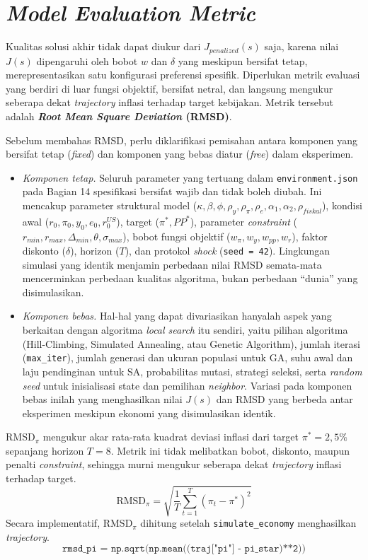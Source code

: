 \section{\textit{Model Evaluation Metric}}

Kualitas solusi akhir tidak dapat diukur dari $J_{penalized}(s)$ saja, karena nilai $J(s)$ dipengaruhi oleh bobot $w$ dan $\delta$ yang meskipun bersifat tetap, merepresentasikan satu konfigurasi preferensi spesifik. Diperlukan metrik evaluasi yang berdiri di luar fungsi objektif, bersifat netral, dan langsung mengukur seberapa dekat \textit{trajectory} inflasi terhadap target kebijakan. Metrik tersebut adalah \textbf{\textit{Root Mean Square Deviation} (RMSD)}.

Sebelum membahas RMSD, perlu diklarifikasi pemisahan antara komponen yang bersifat tetap (\textit{fixed}) dan komponen yang bebas diatur (\textit{free}) dalam eksperimen.

\begin{itemize}
    \item \textit{Komponen tetap.} Seluruh parameter yang tertuang dalam \texttt{environment.json} pada Bagian 14 spesifikasi bersifat wajib dan tidak boleh diubah. Ini mencakup parameter struktural model ($\kappa, \beta, \phi, \rho_y, \rho_\pi, \rho_e, \alpha_1, \alpha_2, \rho_{fiskal}$), kondisi awal ($r_0, \pi_0, y_0, e_0, r_0^{US}$), target ($\pi^{*}, PP^{*}$), parameter \textit{constraint} ($r_{min}, r_{max}, \Delta_{min}, \theta, \sigma_{max}$), bobot fungsi objektif ($w_\pi, w_y, w_{pp}, w_r$), faktor diskonto ($\delta$), horizon ($T$), dan protokol \textit{shock} (\texttt{seed = 42}). Lingkungan simulasi yang identik menjamin perbedaan nilai RMSD semata-mata mencerminkan perbedaan kualitas algoritma, bukan perbedaan ``dunia'' yang disimulasikan.
    \item \textit{Komponen bebas.} Hal-hal yang dapat divariasikan hanyalah aspek yang berkaitan dengan algoritma \textit{local search} itu sendiri, yaitu pilihan algoritma (Hill-Climbing, Simulated Annealing, atau Genetic Algorithm), jumlah iterasi (\texttt{max\_iter}), jumlah generasi dan ukuran populasi untuk GA, suhu awal dan laju pendinginan untuk SA, probabilitas mutasi, strategi seleksi, serta \textit{random seed} untuk inisialisasi state dan pemilihan \textit{neighbor}. Variasi pada komponen bebas inilah yang menghasilkan nilai $J(s)$ dan RMSD yang berbeda antar eksperimen meskipun ekonomi yang disimulasikan identik.
\end{itemize}
RMSD$_{\pi}$ mengukur akar rata-rata kuadrat deviasi inflasi dari target $\pi^{*} = 2{,}5\%$ sepanjang horizon $T = 8$. Metrik ini tidak melibatkan bobot, diskonto, maupun penalti \textit{constraint}, sehingga murni mengukur seberapa dekat \textit{trajectory} inflasi terhadap target.
\[
    \text{RMSD}_{\pi} = \sqrt{\frac{1}{T} \sum_{t=1}^{T} (\pi_t - \pi^{*})^{2}}
\]
Secara implementatif, RMSD$_{\pi}$ dihitung setelah \texttt{simulate\_economy} menghasilkan \textit{trajectory}.
\[
    \texttt{rmsd\_pi = np.sqrt(np.mean((traj["pi"] - pi\_star)**2))}
\]

